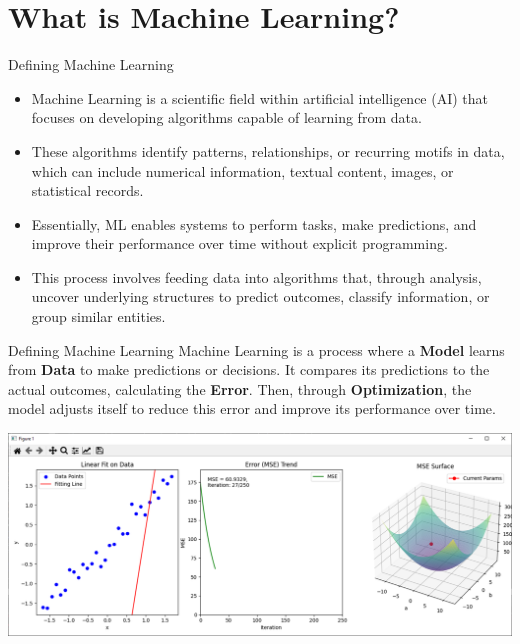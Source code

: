 \documentclass[11pt]{beamer}
\begin{document}
\section{What is Machine Learning?
\\ }
\begin{frame}{Defining Machine Learning}
	\begin{itemize}
		\item Machine Learning is a scientific field within artificial intelligence (AI) that focuses on developing algorithms capable of learning from data. 

		\item These algorithms identify patterns, relationships, or recurring motifs in data, which can include numerical information, textual content, images, or statistical records. 

		\item Essentially, ML enables systems to perform tasks, make predictions, and improve their performance over time without explicit programming. 

		\item This process involves feeding data into algorithms that, through analysis, uncover underlying structures to predict outcomes, classify information, or group similar entities.

	\end{itemize}
\end{frame}
\begin{frame}{Defining Machine Learning}
	Machine Learning is a process where a \textbf{Model} learns from \textbf{Data} to make predictions or decisions. It compares its predictions to the actual outcomes, calculating the \textbf{Error}. Then, through \textbf{Optimization}, the model adjusts itself to reduce this error and improve its performance over time.
	\begin{center}
	\includegraphics[scale=0.38]{../05-pictures/lesson-1-1_pic_0.png}
	\end{center}
\end{frame}
\end{document}
